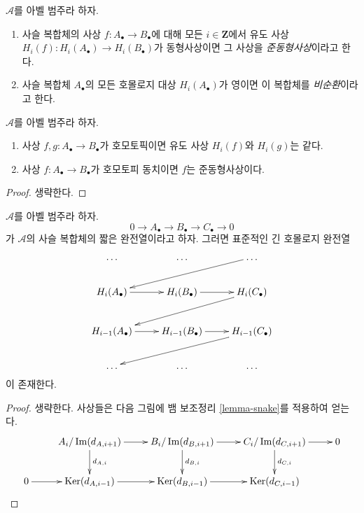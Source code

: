 \begin{definition}
\label{definition-quasi-isomorphism}
$\mathcal{A}$를 아벨 범주라 하자.
\begin{enumerate}
\item 사슬 복합체의 사상 $f : A_\bullet \to B_\bullet$에 대해
모든 $i \in \mathbf{Z}$에서 유도 사상
$H_i(f) : H_i(A_\bullet) \to H_i(B_\bullet)$가 동형사상이면
그 사상을 {\it 준동형사상}이라고 한다.
\item 사슬 복합체 $A_\bullet$의 모든 호몰로지 대상
$H_i(A_\bullet)$가 영이면 이 복합체를 {\it 비순환}이라고 한다.
\end{enumerate}
\end{definition}


\begin{lemma}
\label{lemma-map-homology-homotopy}
$\mathcal{A}$를 아벨 범주라 하자.
\begin{enumerate}
\item 사상 $f, g : A_\bullet \to B_\bullet$가 호모토픽이면
유도 사상 $H_i(f)$와 $H_i(g)$는 같다.
\item 사상 $f : A_\bullet \to B_\bullet$가 호모토피 동치이면
$f$는 준동형사상이다.
\end{enumerate}
\end{lemma}

\begin{proof}
생략한다.
\end{proof}

\begin{lemma}
\label{lemma-long-exact-sequence-chain}
$\mathcal{A}$를 아벨 범주라 하자.
$$
0 \to
A_\bullet \to
B_\bullet \to
C_\bullet \to
0
$$
가 $\mathcal{A}$의 사슬 복합체의 짧은 완전열이라고 하자.
그러면 표준적인 긴 호몰로지 완전열
$$
\xymatrix{
\ldots & \ldots & \ldots \ar[lld] \\
H_i(A_\bullet) \ar[r] & H_i(B_\bullet) \ar[r] & H_i(C_\bullet) \ar[lld] \\
H_{i - 1}(A_\bullet) \ar[r] &
H_{i - 1}(B_\bullet) \ar[r] &
H_{i - 1}(C_\bullet) \ar[lld] \\
\ldots & \ldots & \ldots \\
}
$$
이 존재한다.
\end{lemma}

\begin{proof}
생략한다. 사상들은 다음 그림에 뱀 보조정리
\ref{lemma-snake}를 적용하여 얻는다.
$$
\xymatrix{
&
A_i/\Im(d_{A, i + 1}) \ar[r] \ar[d]^{d_{A, i}} &
B_i/\Im(d_{B, i + 1}) \ar[r] \ar[d]^{d_{B, i}} &
C_i/\Im(d_{C, i + 1}) \ar[r] \ar[d]^{d_{C, i}} &
0 \\
0 \ar[r] &
\Ker(d_{A, i - 1}) \ar[r] &
\Ker(d_{B, i - 1}) \ar[r] &
\Ker(d_{C, i - 1}) &
}
$$
\end{proof}

